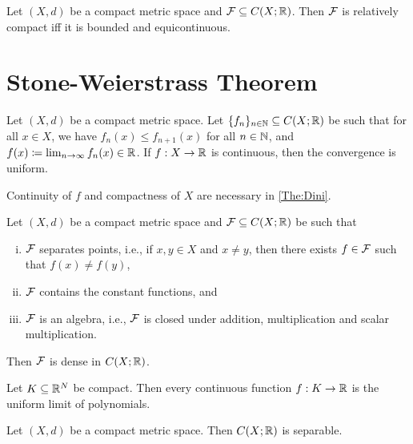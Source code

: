 \documentclass[screen,single]{techreport}
\numberwithin{equation}{section}
\begin{document}
\begin{corollary}\label{Cor:RelCompactIffBoundedAndEquicont}
  Let $(X,d)$ be a compact metric space and $\mathcal{F} \subseteq C(X;\mathbb{R})$.
  Then $\mathcal{F}$ is relatively compact iff it is bounded and equicontinuous.
\end{corollary}

\section{Stone-Weierstrass Theorem}

\begin{theorem}\label{The:Dini}
  Let $(X,d)$ be a compact metric space.
  Let $\{f_n\}_{n \in \mathbb{N}} \subseteq C(X;\mathbb{R})$ be such that for all $x \in X$, we have $f_n(x) \le f_{n+1}(x)$ for all $n \in \mathbb{N}$, and $f(x) \coloneqq \lim_{n \to \infty} f_n(x) \in \mathbb{R}$.
  If $f : X \to \mathbb{R}$ is continuous, then the convergence is uniform.
\end{theorem}

\begin{remark}\label{Rem:ContCompactNecInDini}
  Continuity of $f$ and compactness of $X$ are necessary in \cref{The:Dini}.
\end{remark}

\begin{theorem}[Stone]\label{The:Stone}
  Let $(X,d)$ be a compact metric space and $\mathcal{F} \subseteq C(X;\mathbb{R})$ be such that
  \begin{enumerate}[(i)]
    \item $\mathcal{F}$ separates points, i.e., if $x,y\in X$ and $x \neq y$, then there exists $f \in \mathcal{F}$ such that $f(x) \neq f(y)$,
    \item $\mathcal{F}$ contains the constant functions, and
    \item $\mathcal{F}$ is an algebra, i.e., $\mathcal{F}$ is closed under addition, multiplication and scalar multiplication.
  \end{enumerate}
  Then $\mathcal{F}$ is dense in $C(X;\mathbb{R})$.
\end{theorem}

\begin{theorem}[Weierstrass]\label{The:WeierstrassAsCorOfStone}
  Let $K \subseteq \mathbb{R}^N$ be compact.
  Then every continuous function $f : K \to \mathbb{R}$ is the uniform limit of polynomials.
\end{theorem}

\begin{corollary}\label{Cor:CompactMetricToRSeparable}
  Let $(X,d)$ be a compact metric space.
  Then $C(X;\mathbb{R})$ is separable.
\end{corollary}



\end{document}
